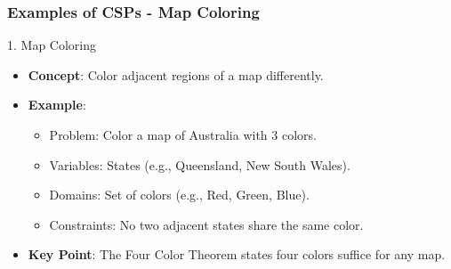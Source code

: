 \documentclass[aspectratio=169]{beamer}
\begin{document}
\begin{frame}[fragile]
    \frametitle{Examples of CSPs - Map Coloring}
    \begin{block}{1. Map Coloring}
        \begin{itemize}
            \item \textbf{Concept}: Color adjacent regions of a map differently.
            \item \textbf{Example}:
            \begin{itemize}
                \item Problem: Color a map of Australia with 3 colors.
                \item Variables: States (e.g., Queensland, New South Wales).
                \item Domains: Set of colors (e.g., Red, Green, Blue).
                \item Constraints: No two adjacent states share the same color.
            \end{itemize}
            \item \textbf{Key Point}: The Four Color Theorem states four colors suffice for any map.
        \end{itemize}
    \end{block}
\end{frame}
\end{document}
